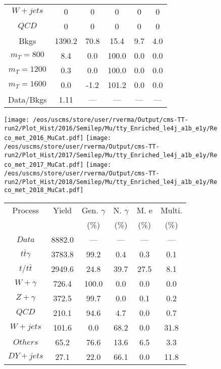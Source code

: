 \begin{figure}
\begin{minipage}[c]{0.32\textwidth}
{\begin{tabular}{cccccc}
$ W+jets $ &  0 &  0 &  0 &  0 &  0\\
$ QCD $ &  0 &  0 &  0 &  0 &  0\\
Bkgs &  1390.2 &  70.8 &  15.4 &  9.7 &  4.0\\
$ m_{T} = 800 $ &  8.4 &  0.0 &  100.0 &  0.0 &  0.0\\
$ m_{T} = 1200 $ &  0.3 &  0.0 &  100.0 &  0.0 &  0.0\\
$ m_{T} = 1600 $ &  0.0 &  -1.2 &  101.2 &  0.0 &  0.0\\
Data/Bkgs &  1.11 &  --- &  --- &  --- &  ---\\
\hline
\end{tabular}
}
\end{minipage}
\end{figure}

\begin{figure}
\centering
\texttt{[image: /eos/uscms/store/user/rverma/Output/cms-TT-run2/Plot\_Hist/2016/Semilep/Mu/tty\_Enriched\_le4j\_a1b\_e1y/Reco\_met\_2016\_MuCat.pdf]}
\texttt{[image: /eos/uscms/store/user/rverma/Output/cms-TT-run2/Plot\_Hist/2017/Semilep/Mu/tty\_Enriched\_le4j\_a1b\_e1y/Reco\_met\_2017\_MuCat.pdf]}
\texttt{[image: /eos/uscms/store/user/rverma/Output/cms-TT-run2/Plot\_Hist/2018/Semilep/Mu/tty\_Enriched\_le4j\_a1b\_e1y/Reco\_met\_2018\_MuCat.pdf]}
\begin{minipage}[c]{0.32\textwidth}
\centering
\tiny{
\begin{tabular}{cccccc}
\hline
Process & Yield & Gen. $\gamma$ & N. $\gamma$ & M. e & Multi. \\
 &  & (\%) & (\%) & (\%) & (\%)  \\
\hline
                                                                      $ Data $ &  8882.0 &  --- &  --- &  --- &  ---\\
$ t\bar{t}\gamma $ &  3783.8 &  99.2 &  0.4 &  0.3 &  0.1\\
$ t/t\bar{t} $ &  2949.6 &  24.8 &  39.7 &  27.5 &  8.1\\
$ W+\gamma $ &  726.4 &  100.0 &  0.0 &  0.0 &  0.0\\
$ Z+\gamma $ &  372.5 &  99.7 &  0.0 &  0.1 &  0.2\\
$ QCD $ &  210.1 &  94.6 &  4.7 &  0.0 &  0.7\\
$ W+jets $ &  101.6 &  0.0 &  68.2 &  0.0 &  31.8\\
$ Others $ &  65.2 &  76.6 &  13.6 &  6.5 &  3.3\\
$ DY+jets $ &  27.1 &  22.0 &  66.1 &  0.0 &  11.8\\

\end{tabular}}
\end{minipage}
\end{figure}
